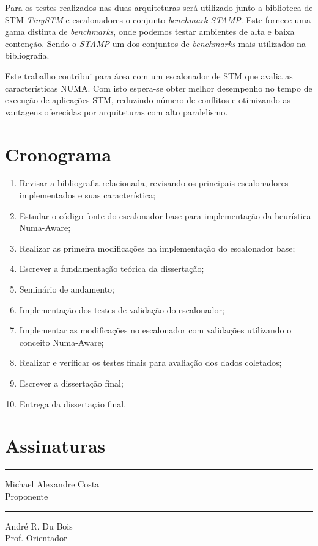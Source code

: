 \documentclass[diss-proposta,nocipinfo]{texufpel}
\begin{document}
Para os testes realizados nas duas arquiteturas será utilizado junto a biblioteca de STM \emph{TinySTM} e escalonadores o conjunto \emph{benchmark STAMP}. Este fornece uma gama distinta de \emph{benchmarks}, onde podemos testar ambientes de alta e baixa contenção. Sendo o \emph{STAMP} um dos conjuntos de \emph{benchmarks} mais utilizados na bibliografia.

Este trabalho contribui para área com um escalonador de STM que avalia as características NUMA. Com isto espera-se obter melhor desempenho no tempo de execução de aplicações STM, reduzindo número de conflitos e otimizando as vantagens oferecidas por arquiteturas com alto paralelismo.


\chapter{Cronograma}

\begin{enumerate}
  \item Revisar a bibliografia relacionada, revisando os principais escalonadores implementados e suas característica;
  \item Estudar o código fonte do escalonador base para implementação da heurística Numa-Aware;
  \item Realizar as primeira modificações na implementação do escalonador base;
  \item Escrever a fundamentação teórica da dissertação;
  \item Seminário de andamento;
  \item Implementação dos testes de validação do escalonador;
  \item Implementar as modificações no escalonador com validações utilizando o conceito Numa-Aware;
  \item Realizar e verificar os testes finais para avaliação dos dados coletados;
  \item Escrever a dissertação final;
  \item Entrega da dissertação final.
\end{enumerate}






\chapter{Assinaturas}
\vspace{2cm}

\begin{center}
\rule{8cm}{.3mm}
\medskip

	Michael Alexandre Costa\\
	Proponente

\end{center}

\vspace{4cm}

\begin{center}
\rule{8cm}{.3mm}
\medskip

	André R. Du Bois\\
	Prof. Orientador

\end{center}
\end{document}
